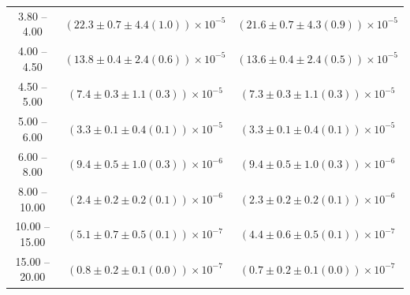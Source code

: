 \begin{table}
\begin{center}
\begin{tabular}{ c | c c }
3.80 -- 4.00 & $(22.3\pm0.7\pm4.4(1.0))\times10^{-5}$ & $(21.6\pm0.7\pm4.3(0.9))\times10^{-5}$ \\ 
4.00 -- 4.50 & $(13.8\pm0.4\pm2.4(0.6))\times10^{-5}$ & $(13.6\pm0.4\pm2.4(0.5))\times10^{-5}$ \\ 
4.50 -- 5.00 & $(7.4\pm0.3\pm1.1(0.3))\times10^{-5}$ & $(7.3\pm0.3\pm1.1(0.3))\times10^{-5}$ \\ 
5.00 -- 6.00 & $(3.3\pm0.1\pm0.4(0.1))\times10^{-5}$ & $(3.3\pm0.1\pm0.4(0.1))\times10^{-5}$ \\ 
6.00 -- 8.00 & $(9.4\pm0.5\pm1.0(0.3))\times10^{-6}$ & $(9.4\pm0.5\pm1.0(0.3))\times10^{-6}$ \\ 
8.00 -- 10.00 & $(2.4\pm0.2\pm0.2(0.1))\times10^{-6}$ & $(2.3\pm0.2\pm0.2(0.1))\times10^{-6}$ \\ 
10.00 -- 15.00 & $(5.1\pm0.7\pm0.5(0.1))\times10^{-7}$ & $(4.4\pm0.6\pm0.5(0.1))\times10^{-7}$ \\ 
15.00 -- 20.00 & $(0.8\pm0.2\pm0.1(0.0))\times10^{-7}$ & $(0.7\pm0.2\pm0.1(0.0))\times10^{-7}$ \\ 
\hline
\end{tabular}
\end{center}
\end{table}
 
